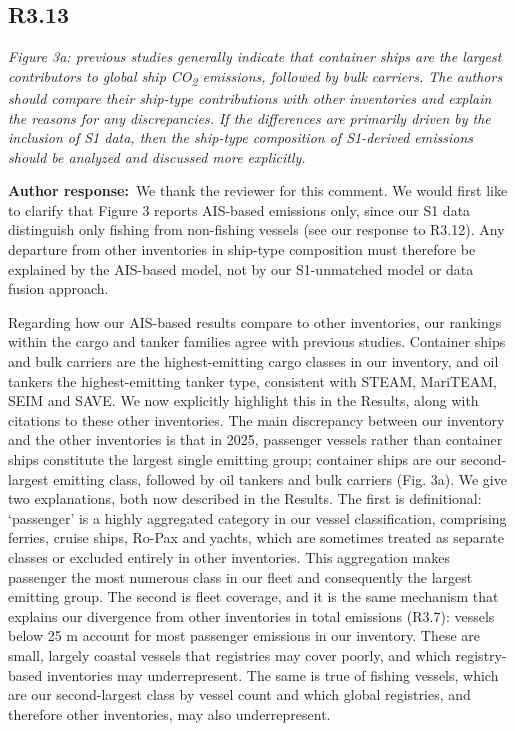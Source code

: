 \documentclass[11pt]{article}
\newcommand{\point}[1]{\subsection*{\normalfont\bfseries #1}}
\newcommand{\response}{\par\medskip\noindent%
  \textbf{\textcolor{respblue}{Author response:}}\ }
\begin{document}
\point{R3.13}

\begin{refquote}\itshape
Figure 3a: previous studies generally indicate that container ships are the largest contributors to global ship CO\textsubscript{2} emissions, followed by bulk carriers. The authors should compare their ship-type contributions with other inventories and explain the reasons for any discrepancies. If the differences are primarily driven by the inclusion of S1 data, then the ship-type composition of S1-derived emissions should be analyzed and discussed more explicitly.
\end{refquote}

\response We thank the reviewer for this comment. We would first like to clarify that Figure 3 reports AIS-based emissions only, since our S1 data distinguish only fishing from non-fishing vessels (see our response to R3.12). Any departure from other inventories in ship-type composition must therefore be explained by the AIS-based model, not by our S1-unmatched model or data fusion approach.

Regarding how our AIS-based results compare to other inventories, our rankings within the cargo and tanker families agree with previous studies. Container ships and bulk carriers are the highest-emitting cargo classes in our inventory, and oil tankers the highest-emitting tanker type, consistent with STEAM, MariTEAM, SEIM and SAVE. We now explicitly highlight this in the Results, along with citations to these other inventories. The main discrepancy between our inventory and the other inventories is that in 2025, passenger vessels rather than container ships constitute the largest single emitting group; container ships are our second-largest emitting class, followed by oil tankers and bulk carriers (Fig. 3a). We give two explanations, both now described in the Results. The first is definitional: `passenger' is a highly aggregated category in our vessel classification, comprising ferries, cruise ships, Ro-Pax and yachts, which are sometimes treated as separate classes or excluded entirely in other inventories. This aggregation makes passenger the most numerous class in our fleet and consequently the largest emitting group. The second is fleet coverage, and it is the same mechanism that explains our divergence from other inventories in total emissions (R3.7): vessels below 25 m account for most passenger emissions in our inventory. These are small, largely coastal vessels that registries may cover poorly, and which registry-based inventories may underrepresent. The same is true of fishing vessels, which are our second-largest class by vessel count and which global registries, and therefore other inventories, may also underrepresent.
\end{document}
